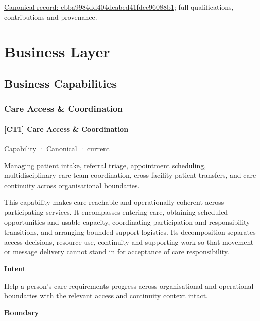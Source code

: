 {\footnotesize \href{../../../../continuum/strategy/capability/cbba9984dd404deabed41fdcc96088b1.md}{Canonical record: cbba9984dd404deabed41fdcc96088b1}; full qualifications, contributions and provenance.}\par
\chapter{Business Layer}

\section{Business Capabilities}

\subsection{Care Access \& Coordination}

\subsubsection{[CT1] Care Access \& Coordination}

\label{element:ed342cb8656b4f80b55ad519ecbd2d3a}
{\small Capability · Canonical · current}\par

Managing patient intake, referral triage, appointment scheduling, multidisciplinary care team coordination, cross-facility patient transfers, and care continuity across organisational boundaries.



This capability makes care reachable and operationally coherent across participating services. It encompasses entering care, obtaining scheduled opportunities and usable capacity, coordinating participation and responsibility transitions, and arranging bounded support logistics. Its decomposition separates access decisions, resource use, continuity and supporting work so that movement or message delivery cannot stand in for acceptance of care responsibility.



\textbf{Intent}



Help a person's care requirements progress across organisational and operational boundaries with the relevant access and continuity context intact.



\textbf{Boundary}




